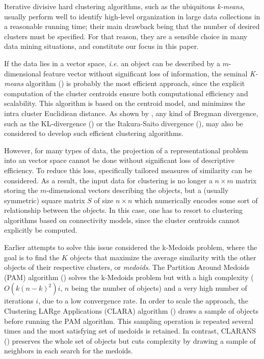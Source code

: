 \documentclass[a4paper,twoside]{article}
\begin{document}
Iterative divisive hard clustering algorithms, such as the ubiquitous \emph{k-means}, usually perform well to identify high-level organization in large data collections in a reasonable running time; their main drawback being that the number of desired clusters must be specified. For that reason, they are a sensible choice in many data mining situations, and constitute our focus in this paper.

If the data lies in a vector space, \textit{i.e.} an object can be described by a $m$-dimensional feature vector without significant loss of information, the seminal \emph{K-means} algorithm (\cite{macQueenBsmsp67}) is probably the most efficient approach, since the explicit computation of the cluster centroids ensure both computational efficiency and scalability. This algorithm is  based on the centroid model, and minimizes the intra cluster Euclidiean distance. As shown by \cite{Banerjee:2005:CBD:1046920.1194902}, any kind of Bregman divergence, such as the KL-divergence (\cite{Dhillon:2003:DIT:944919.944973}) or the Itakura-Saito divergence (\cite{linde:algorithm}), may also be considered to develop such efficient clustering algorithms.

However, for many types of data, the projection of a representational problem into an vector space cannot be done without significant loss of descriptive efficiency. To reduce this loss, specifically tailored measures of similarity can be considered. As a result, the input data for clustering is no longer a $n \times m$ matrix storing the $m$-dimensional vectors describing the objects, but a (usually symmetric) square matrix $S$ of size $n \times n$ which numerically encodes some sort of relationship between the objects. In this case, one has to resort to clustering algorithms based on connectivity models, since the cluster centroids cannot explicitly be computed.

Earlier attempts to solve this issue considered the k-Medoids problem, where the goal is to find the $K$ objects that maximize the average similarity with the other objects of their respective clusters, or \emph{medoids}. The Partition Around Medoids (PAM) algorithm (\cite{KaufmanRousseeuw90}) solves the k-Medoids problem but with a high complexity ($O(k(n-k)^2)i$, $n$ being the number of objects) and a very high number of iterations $i$, due to a low convergence rate. In order to scale the approach, the Clustering LARge Applications (CLARA) algorithm (\cite{KaufmanRousseeuw90}) draws a sample of objects before running the PAM algorithm. This sampling operation is repeated several times and the most satisfying set of medoids is retained. In contrast, CLARANS (\cite{Ng:1994:EEC:645920.672827}) preserves the whole set of objects but cuts complexity by  drawing a sample of neighbors in each search for the medoids.
\end{document}
